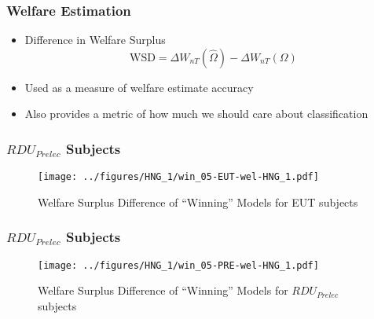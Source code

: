 \documentclass{beamer}
\begin{document}
\begin{frame}
\frametitle{Welfare Estimation}
\begin{itemize}
	\item Difference in Welfare Surplus
	\begin{equation}
		\label{eq4:wsurplusDiff}
		\text{WSD} = \Delta W_{nT}(\hat{\Omega}) - \Delta W_{nT}(\Omega)
	\end{equation}
	\item Used as a measure of welfare estimate accuracy
	\item Also provides a metric of how much we should care about classification
\end{itemize}
\end{frame}
%
%
\begin{frame}
\frametitle{ $\mathit{RDU_{Prelec}}$ Subjects}
\begin{figure}[hb!]
	\center
	\caption{Welfare Surplus Difference of \enquote{Winning} Models for EUT subjects}
	\texttt{[image: ../figures/HNG\_1/win\_05-EUT-wel-HNG\_1.pdf]}
	\label{fig:HN1_wel_eut}
\end{figure}
\end{frame}

\begin{frame}
\frametitle{ $\mathit{RDU_{Prelec}}$ Subjects}
\begin{figure}[hb!]
	\center
	\caption{Welfare Surplus Difference of \enquote{Winning} Models for $\mathit{RDU_{Prelec}}$ subjects}
	\texttt{[image: ../figures/HNG\_1/win\_05-PRE-wel-HNG\_1.pdf]}
	\label{fig:HN1_wel_pre}
\end{figure}
\end{frame}
\end{document}
